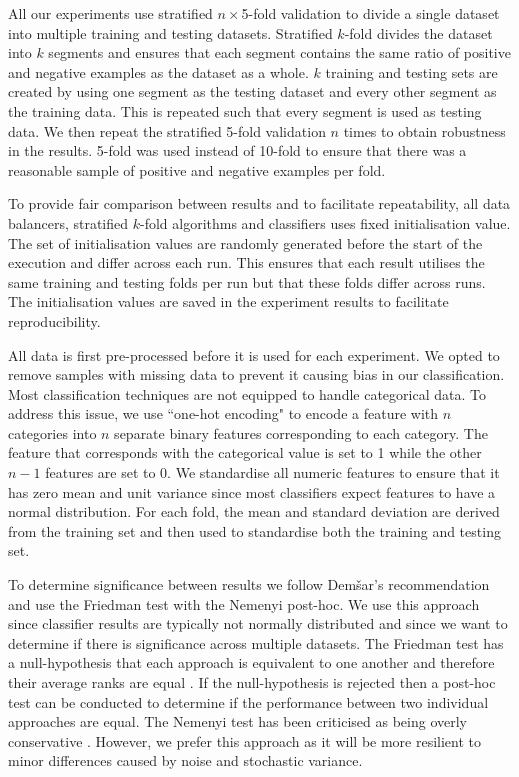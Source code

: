 \documentclass{sig-alternate-05-2015}
\begin{document}
	All our experiments use stratified $n\times$5-fold validation to divide a single dataset into multiple training and testing datasets. Stratified $k$-fold divides the dataset into $k$ segments and ensures that each segment contains the same ratio of positive and negative examples as the dataset as a whole. $k$ training and testing sets are created by using one segment as the testing dataset and every other segment as the training data. This is repeated such that every segment is used as testing data. We then repeat the stratified 5-fold validation $n$ times to obtain robustness in the results. 5-fold was used instead of 10-fold to ensure that there was a reasonable sample of positive and negative examples per fold.
	
	To provide fair comparison between results and to facilitate repeatability, all data balancers, stratified $k$-fold algorithms and classifiers uses fixed initialisation value. The set of initialisation values are randomly generated before the start of the execution and differ across each run. This ensures that each result utilises the same training and testing folds per run but that these folds differ across runs. The initialisation values are saved in the experiment results to facilitate reproducibility.
	
	All data is first pre-processed before it is used for each experiment. We opted to remove samples with missing data to prevent it causing bias in our classification. Most classification techniques are not equipped to handle categorical data. To address this issue, we use ``one-hot encoding" to encode a feature with $n$ categories into $n$ separate binary features corresponding to each category. The feature that corresponds with the categorical value is set to 1 while the other $n-1$ features are set to 0. We standardise all numeric features to ensure that it has zero mean and unit variance since most classifiers expect features to have a normal distribution. For each fold, the mean and standard deviation are derived from the training set and then used to standardise both the training and testing set. 
	
	To determine significance between results we follow Dem\v{s}ar's \cite{Demsar:2006:SCC:1248547.1248548} recommendation and use the Friedman test with the Nemenyi post-hoc. We use this approach since classifier results are typically not normally distributed and since we want to determine if there is significance across multiple datasets. The Friedman test has a null-hypothesis that each approach is equivalent to one another and therefore their average ranks are equal \cite{Demsar:2006:SCC:1248547.1248548}. If the null-hypothesis is rejected then a post-hoc test can be conducted to determine if the performance between two individual approaches are equal. The Nemenyi test has been criticised as being overly conservative \cite{garcia2008extension}. However, we prefer this approach as it will be more resilient to minor differences caused by noise and stochastic variance.
	
\end{document}

